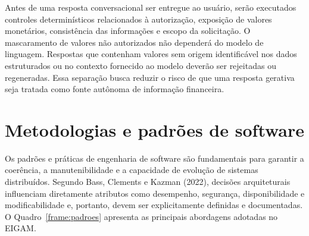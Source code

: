 Antes de uma resposta conversacional ser entregue ao usuário, serão executados controles determinísticos relacionados à autorização, exposição de valores monetários, consistência das informações e escopo da solicitação. O mascaramento de valores não autorizados não dependerá do modelo de linguagem. Respostas que contenham valores sem origem identificável nos dados estruturados ou no contexto fornecido ao modelo deverão ser rejeitadas ou regeneradas. Essa separação busca reduzir o risco de que uma resposta gerativa seja tratada como fonte autônoma de informação financeira.

\section{Metodologias e padrões de software}

Os padrões e práticas de engenharia de software são fundamentais para garantir a coerência, a manutenibilidade e a capacidade de evolução de sistemas distribuídos. Segundo Bass, Clements e Kazman (2022), decisões arquiteturais influenciam diretamente atributos como desempenho, segurança, disponibilidade e modificabilidade e, portanto, devem ser explicitamente definidas e documentadas. O Quadro~\ref{frame:padroes} apresenta as principais abordagens adotadas no EIGAM.

